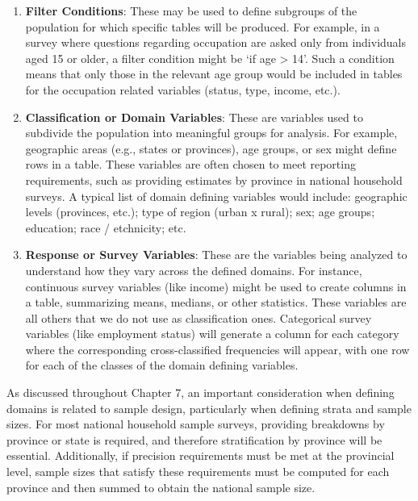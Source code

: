 \documentclass[
  12pt,
]{book}
\begin{document}
\begin{enumerate}
\def\labelenumi{\arabic{enumi}.}
\item
  \textbf{Filter Conditions}: These may be used to define subgroups of the population for which specific tables will be produced. For example, in a survey where questions regarding occupation are asked only from individuals aged 15 or older, a filter condition might be `if age \textgreater{} 14'. Such a condition means that only those in the relevant age group would be included in tables for the occupation related variables (status, type, income, etc.).
\item
  \textbf{Classification or Domain Variables}: These are variables used to subdivide the population into meaningful groups for analysis. For example, geographic areas (e.g., states or provinces), age groups, or sex might define rows in a table. These variables are often chosen to meet reporting requirements, such as providing estimates by province in national household surveys. A typical list of domain defining variables would include: geographic levels (provinces, etc.); type of region (urban x rural); sex; age groups; education; race / etchnicity; etc.
\item
  \textbf{Response or Survey Variables}: These are the variables being analyzed to understand how they vary across the defined domains. For instance, continuous survey variables (like income) might be used to create columns in a table, summarizing means, medians, or other statistics. These variables are all others that we do not use as classification ones. Categorical survey variables (like employment status) will generate a column for each category where the corresponding cross-classified frequencies will appear, with one row for each of the classes of the domain defining variables.
\end{enumerate}

As discussed throughout Chapter 7, an important consideration when defining domains is related to sample design, particularly when defining strata and sample sizes. For most national household sample surveys, providing breakdowns by province or state is required, and therefore stratification by province will be essential. Additionally, if precision requirements must be met at the provincial level, sample sizes that satisfy these requirements must be computed for each province and then summed to obtain the national sample size.
\end{document}
